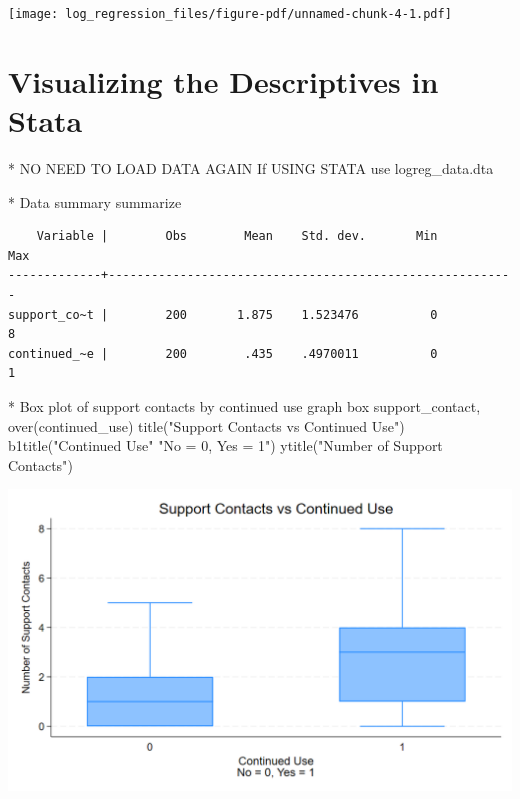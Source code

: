 \documentclass[
  letterpaper,
  DIV=11,
  numbers=noendperiod]{scrreprt}
\newenvironment{Shaded}{\begin{snugshade}}{\end{snugshade}}
\newcommand{\BaseNTok}[1]{\textcolor[rgb]{0.68,0.00,0.00}{#1}}
\newcommand{\KeywordTok}[1]{\textcolor[rgb]{0.00,0.23,0.31}{#1}}
\newcommand{\NormalTok}[1]{\textcolor[rgb]{0.00,0.23,0.31}{#1}}
\newcommand{\StringTok}[1]{\textcolor[rgb]{0.13,0.47,0.30}{#1}}
\begin{document}
\texttt{[image: log\_regression\_files/figure-pdf/unnamed-chunk-4-1.pdf]}

\section{Visualizing the Descriptives in
Stata}\label{visualizing-the-descriptives-in-stata-1}

\begin{Shaded}
\begin{Highlighting}[]
\NormalTok{* NO NEED TO LOAD DATA AGAIN If USING }\KeywordTok{STATA}
\KeywordTok{use}\NormalTok{ logreg\_data.dta}

\NormalTok{* Data summary}
\KeywordTok{summarize}
\end{Highlighting}
\end{Shaded}

\begin{verbatim}
    Variable |        Obs        Mean    Std. dev.       Min        Max
-------------+---------------------------------------------------------
support_co~t |        200       1.875    1.523476          0          8
continued_~e |        200        .435    .4970011          0          1
\end{verbatim}

\begin{Shaded}
\begin{Highlighting}[]
\NormalTok{* Box plot }\KeywordTok{of}\NormalTok{ support contacts }\KeywordTok{by}\NormalTok{ continued }\KeywordTok{use}
\KeywordTok{graph}\NormalTok{ box support\_contact, }\BaseNTok{over}\NormalTok{(continued\_use) }\BaseNTok{title}\NormalTok{(}\StringTok{"Support Contacts vs Continued Use"}\NormalTok{) b1title(}\StringTok{"Continued Use"} \StringTok{"No = 0, Yes = 1"}\NormalTok{) }\BaseNTok{ytitle}\NormalTok{(}\StringTok{"Number of Support Contacts"}\NormalTok{)}
\end{Highlighting}
\end{Shaded}

\includegraphics{images/log_regression_boxplot.png}
\end{document}
